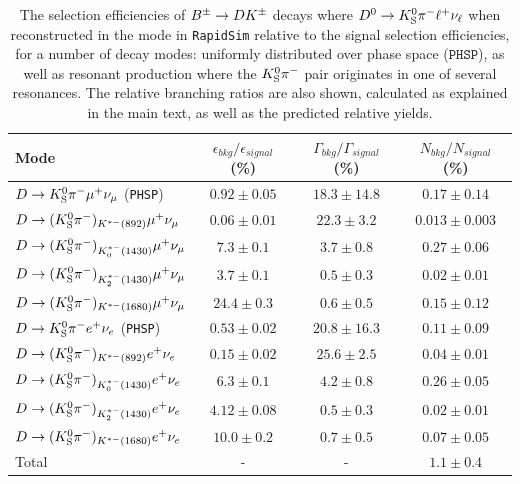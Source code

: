 \begin{table}
    \centering
    \caption{The selection efficiencies of ${{B}^\pm}\rightarrow{\ensuremath{D}}{\ensuremath{{K}^\pm}}$ decays where ${{D}^0}\rightarrow{\ensuremath{{K}^0_{\mathrm{S}}}}{\ensuremath{{\pi}^-}}\ell^+\nu_\ell$ when reconstructed in the \DtoKspipi mode in \texttt{RapidSim} relative to the signal selection efficiencies, for a number of decay modes: uniformly distributed over phase space ($\texttt{PHSP}$), as well as resonant production where the ${{K}^0_{\mathrm{S}}}{{\pi}^-}$ pair originates in one of several \Kstar resonances. The relative branching ratios are also shown, calculated as explained in the main text, as well as the predicted relative yields.
    \label{tab:relative_d2ksellnu_yields}}
    \begin{tabular}{l |cc|c}
    \toprule
    Mode & $\epsilon_{bkg}/\epsilon_{signal}$ (\%)& $\Gamma_{bkg}/\Gamma_{signal}$ (\%)& $N_{bkg}/N_{signal}$ (\%)\\
    \midrule

    ${D}\rightarrow{\ensuremath{{K}^0_{\mathrm{S}}}}{\ensuremath{{\pi}^-}}\mu^+\nu_{\mu}$ (\texttt{PHSP})     & $0.92 \pm 0.05$ & $18.3 \pm 14.8$ & $0.17 \pm 0.14$\\
    ${D}\rightarrow ({{K}^0_{\mathrm{S}}}{{\pi}^-})_{K^{*-}(892)}\mu^+\nu_{\mu}$    & $0.06\pm0.01$ & $22.3\pm 3.2$ & $0.013 \pm 0.003$ \\
    ${D}\rightarrow ({{K}^0_{\mathrm{S}}}{{\pi}^-})_{K^{*-}_0(1430)}\mu^+\nu_{\mu}$ & $7.3 \pm 0.1$ & $3.7 \pm 0.8$ & $0.27 \pm 0.06   $\\
    ${D}\rightarrow ({{K}^0_{\mathrm{S}}}{{\pi}^-})_{K^{*-}_2(1430)}\mu^+\nu_{\mu}$ & $3.7 \pm 0.1$ & $0.5 \pm 0.3$ & $0.02 \pm 0.01$   \\
    ${D}\rightarrow ({{K}^0_{\mathrm{S}}}{{\pi}^-})_{K^{*-}(1680)}\mu^+\nu_{\mu}$   & $24.4 \pm 0.3$ & $0.6 \pm 0.5$ & $0.15 \pm 0.12$\\
    \midrule
    ${D}\rightarrow{\ensuremath{{K}^0_{\mathrm{S}}}}{\ensuremath{{\pi}^-}} e^+\nu_{e}$ (\texttt{PHSP})       & $0.53\pm0.02$ & $20.8\pm16.3$ & $0.11 \pm 0.09$\\
    ${D}\rightarrow ({{K}^0_{\mathrm{S}}}{{\pi}^-})_{K^{*-}(892)} e^+\nu_{e}$      & $0.15\pm0.02$ & $25.6 \pm 2.5$ & $0.04 \pm 0.01$\\
    ${D}\rightarrow ({{K}^0_{\mathrm{S}}}{{\pi}^-})_{K^{*-}_0(1430)} e^+\nu_{e}$   & $6.3 \pm 0.1$ & $4.2\pm0.8$ & $0.26\pm0.05$\\
    ${D}\rightarrow ({{K}^0_{\mathrm{S}}}{{\pi}^-})_{K^{*-}_2(1430)} e^+\nu_{e}$   & $4.12 \pm 0.08$ & $0.5 \pm 0.3$ & $0.02\pm0.01$\\
    ${D}\rightarrow ({{K}^0_{\mathrm{S}}}{{\pi}^-})_{K^{*-}(1680)} e^+\nu_{e}$     & $10.0 \pm 0.2$ & $0.7 \pm 0.5$ & $0.07\pm0.05$\\
    \midrule
    Total & - & - & $1.1\pm0.4$\\
    \bottomrule
    \end{tabular}
\end{table}

